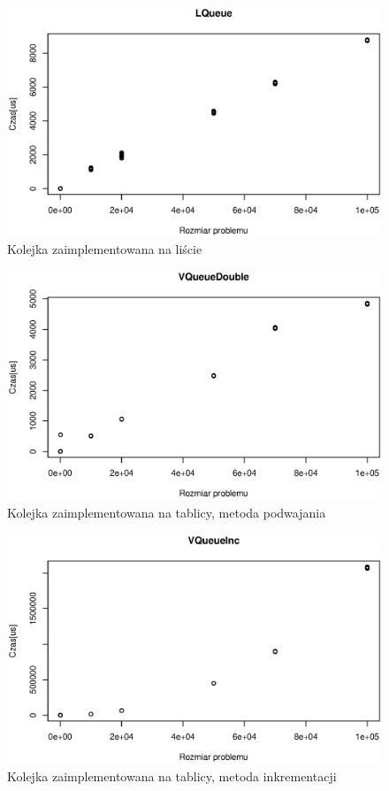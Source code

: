 \documentclass[10pt,a4paper]{article}
\begin{document}
\begin{figure}[H]
\centering
\includegraphics[width=0.7\linewidth]{./Wykresy/LQueue}
\caption{Kolejka zaimplementowana na liście}
\label{fig:LQueue}
\end{figure}

\begin{figure}[H]
\centering
\includegraphics[width=0.7\linewidth]{./Wykresy/VQueueDouble}
\caption{Kolejka zaimplementowana na tablicy, metoda podwajania}
\label{fig:VQueueDouble}
\end{figure}

\begin{figure}
\centering
\includegraphics[width=0.7\linewidth]{./Wykresy/VQueueInc}
\caption{Kolejka zaimplementowana na tablicy, metoda inkrementacji}
\label{fig:VQueueInc}
\end{figure}
\end{document}
